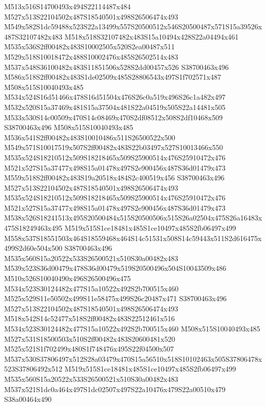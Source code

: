 \documentclass{article}
\begin{document}
\begin{multicols}{2}
M513x516S14700493x494S22114487x484 M527x513S22104502x487S18540501x498S26506474x493 M549x582S1dc59488x523S22a13499x557S20500512x546S20500487x571S15a39526x487S32107482x483 M518x518S32107482x483S15a10494x428S22a04494x461 M535x536S2ff00482x483S10002505x520S2ea00487x511 M529x518S10018472x488S10002476x485S26502514x483 M537x548S36100482x483S11851506x528S2dd00457x526 S38700463x496 M586x518S2ff00482x483S1de02509x485S28806543x497S1f702571x487 M508x515S10040493x485 M534x524S16d51466x478S16d51504x476S26c0a519x496S26c1a482x497 M532x520S15a37469x481S15a37504x481S22a04519x505S22a14481x505 M533x530S14c00509x470S14c08469x470S2df08512x508S2df10468x509 S38700463x496 M508x515S10040493x485 M536x541S2ff00482x483S10010486x511S26500522x500 M549x571S10017519x507S2ff00482x483S22b03497x527S10013466x550 M535x524S18210512x509S18218465x509S25900514x476S25910472x476 M521x527S15a37477x498S15a01478x497S2e900456x487S36d01479x473 M559x518S2ff00482x483S19a20518x484S2c400519x456 S38700463x496 M527x513S22104502x487S18540501x498S26506474x493 M535x524S18210512x509S18218465x509S25900514x476S25910472x476 M521x527S15a37477x498S15a01478x497S2e900456x487S36d01479x473 M538x526S18241513x495S20500484x515S20500506x515S26a02504x475S26a16483x475S18249463x495 M519x515S1ce18481x485S1ce10497x485S2fb06497x499 M558x537S18551503x464S18559468x464S14c51531x508S14c59443x511S2d616475x499S2d60e504x500 S38700463x496 M535x560S15a20522x533S26500521x510S30a00482x483 M539x523S36d00479x478S36d00479x519S20500496x504S10043509x486 M510x526S10040490x496S26500496x475 M534x523S30124482x477S15a10522x492S2b700515x460 M525x529S11e50502x499S11e58475x499S26c20487x471 S38700463x496 M527x513S22104502x487S18540501x498S26506474x493 M518x542S14c52477x518S2ff00482x483S22512461x516 M534x523S30124482x477S15a10522x492S2b700515x460 M508x515S10040493x485 M527x531S18500503x510S2ff00482x483S20600481x520 M525x521S1f702499x480S1f748476x495S22f04500x507 M537x530S37806497x512S28a03479x470S15a56510x518S10102463x505S37806478x523S37806492x512 M519x515S1ce18481x485S1ce10497x485S2fb06497x499 M535x560S15a20522x533S26500521x510S30a00482x483 M537x521S1dc0a464x497S1dc02507x497S22a10476x479S22a00510x479 S38a00464x490


\end{multicols}
\end{document}
